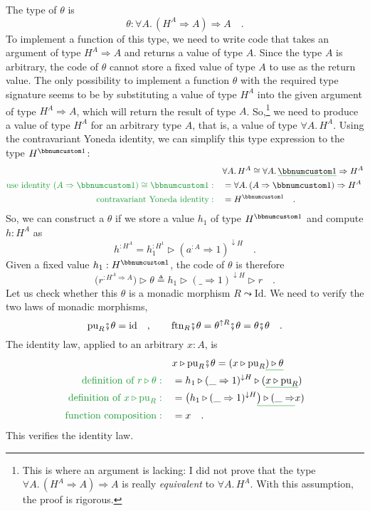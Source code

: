 The type of $\theta$ is
\[
\theta:\forall A.\,(H^{A}\Rightarrow A)\Rightarrow A\quad.
\]
To implement a function of this type, we need to write code that takes
an argument of type $H^{A}\Rightarrow A$ and returns a value of type
$A$. Since the type $A$ is arbitrary, the code of $\theta$ cannot
store a fixed value of type $A$ to use as the return value. The only
possibility to implement a function $\theta$ with the required type
signature seems to be by substituting a value of type $H^{A}$ into
the given argument of type $H^{A}\Rightarrow A$, which will return
the result of type $A$. So,\footnote{This is where an argument is lacking: I did not prove that the type
$\forall A.\,(H^{A}\Rightarrow A)\Rightarrow A$ is really \emph{equivalent}
to $\forall A.\,H^{A}$. With this assumption, the proof is rigorous.} we need to produce a value of type $H^{A}$ for an arbitrary type
$A$, that is, a value of type $\forall A.\,H^{A}$. Using the contravariant
Yoneda identity, we can simplify this type expression to the type
$H^{\bbnum 1}$:
\begin{align*}
 & \forall A.\,H^{A}\cong\forall A.\,\gunderline{\bbnum 1}\Rightarrow H^{A}\\
{\color{greenunder}\text{use identity }(A\Rightarrow\bbnum 1)\cong\bbnum 1:}\quad & =\forall A.\,(A\Rightarrow\bbnum 1)\Rightarrow H^{A}\\
{\color{greenunder}\text{contravariant Yoneda identity}:}\quad & =H^{\bbnum 1}\quad.
\end{align*}
So, we can construct a $\theta$ if we store a value $h_{1}$ of type
$H^{\bbnum 1}$ and compute $h:H^{A}$ as
\[
h^{:H^{A}}=h_{1}^{:H^{1}}\triangleright(a^{:A}\Rightarrow1)^{\downarrow H}\quad.
\]
Given a fixed value $h_{1}:H^{\bbnum 1}$, the code of $\theta$ is
therefore
\begin{equation}
\big(r^{:H^{A}\Rightarrow A}\big)\triangleright\theta\triangleq h_{1}\triangleright(\_\Rightarrow1)^{\downarrow H}\triangleright r\quad.\label{eq:rigid-monad-base-runner-1}
\end{equation}
Let us check whether this $\theta$ is a monadic morphism $R\leadsto\text{Id}$.
We need to verify the two laws of monadic morphisms,
\[
\text{pu}_{R}\bef\theta=\text{id}\quad,\quad\quad\text{ftn}_{R}\bef\theta=\theta^{\uparrow R}\bef\theta=\theta\bef\theta\quad.
\]
The identity law, applied to an arbitrary $x:A$, is
\begin{align*}
 & x\triangleright\text{pu}_{R}\bef\theta=(x\triangleright\text{pu}_{R}\gunderline{)\triangleright\theta}\\
{\color{greenunder}\text{definition of }r\triangleright\theta:}\quad & =h_{1}\triangleright(\_\Rightarrow1)^{\downarrow H}\triangleright(\gunderline{x\triangleright\text{pu}_{R}})\\
{\color{greenunder}\text{definition of }x\triangleright\text{pu}_{R}:}\quad & =\big(h_{1}\triangleright(\_\Rightarrow1)^{\downarrow H}\gunderline{\big)\triangleright(\_\Rightarrow}x)\\
{\color{greenunder}\text{function composition}:}\quad & =x\quad.
\end{align*}
This verifies the identity law. 

